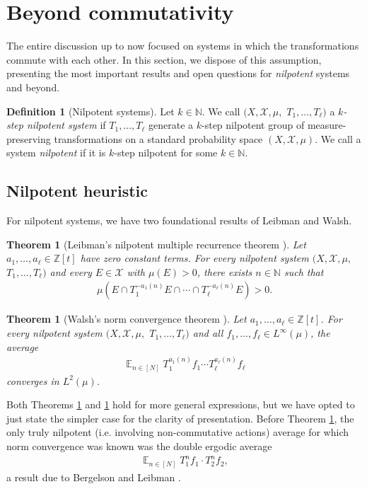 \documentclass[11pt]{amsart}
\newtheorem{theorem}[lemma]{Theorem}
\theoremstyle{definition}
\newtheorem{definition}[lemma]{Definition}
\DeclareMathOperator*{\E}{\mathbb{E}}
\newcommand{\N}{{\mathbb N}}
\newcommand{\Z}{{\mathbb Z}}
\newcommand{\CX}{{\mathcal X}}
\newcommand{\1}{{\mathbf{1}}}
\begin{document}
\section{Beyond commutativity}\label{S: beyond commutativity}
The entire discussion up to now focused on systems in which the transformations commute with each other. In this section, we dispose of this assumption, 
presenting the most important results and open questions for \emph{nilpotent} systems and beyond. 
\begin{definition}[Nilpotent systems]
    Let $k\in\N$. We call $(X, \CX, \mu,$\! $T_1, \ldots, T_\ell)$ a \emph{$k$-step nilpotent system} if $T_1, \ldots, T_\ell$ generate a $k$-step nilpotent group of measure-preserving transformations on a standard probability space $(X, \CX, \mu)$. We call a system \emph{nilpotent} if it is $k$-step nilpotent for some $k\in\N$.
\end{definition}

\subsection{Nilpotent heuristic}

For nilpotent systems, we have two foundational results of Leibman and Walsh.
\begin{theorem}[Leibman's nilpotent multiple recurrence theorem {\cite[Theorem 0.4]{L98}}]\label{T: Leibman nilpotent}
    Let $a_1, \ldots, a_\ell\in\Z[t]$ have zero constant terms. For every nilpotent system $(X, \CX, \mu,$\! $T_1, \ldots, T_\ell)$ and every $E\in\CX$ with $\mu(E)>0$, there exists $n\in\N$ such that
    \begin{align*}
        \mu(E\cap T_1^{-a_1(n)}E\cap \cdots \cap T_\ell^{-a_\ell(n)}E)>0.
    \end{align*}
\end{theorem}
\begin{theorem}[Walsh's norm convergence theorem {\cite[Theorem 1.1]{W12}}]\label{T: Walsh}
    Let $a_1, \ldots, a_\ell\in\Z[t]$. For every nilpotent system $(X, \CX, \mu,$\! $T_1, \ldots, T_\ell)$ and all $f_1, \ldots, f_\ell\in L^\infty(\mu)$, the average
    \begin{align*}
        \E_{n\in[N]}T_1^{a_1(n)}f_1\cdots T_\ell^{a_\ell(n)}f_\ell
    \end{align*}
    converges in $L^2(\mu)$.
\end{theorem}
Both Theorems \ref{T: Leibman nilpotent} and \ref{T: Walsh} hold for more general expressions, but we have opted to just state the simpler case for the clarity of presentation. Before Theorem \ref{T: Walsh}, the only truly nilpotent (i.e. involving non-commutative actions) average for which norm convergence was known was the double ergodic average
\begin{align}\label{E: BL nilpotent average}
    \E_{n\in[N]}T_1^n f_1\cdot T_2^n f_2,
\end{align}
a result due to Bergelson and Leibman \cite{BL02}. %
\end{document}

